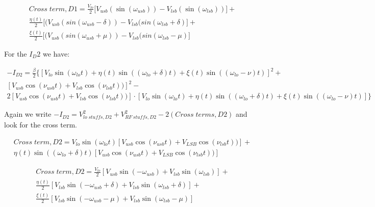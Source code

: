 \begin{equation}
    \boxed{
    \begin{gathered}
    Cross\;term,D1 = \frac{V_{lo}}{2} \big[
        V_{usb}(\sin(\omega_{usb})) - V_{lsb}(
        \sin(\omega_{lsb})) \big] +\\
        \frac{\eta(t)}{2} \big[ (V_{usb} (sin(\omega_{usb}-\delta)
        )-V_{lsb}(sin(\omega_{lsb}+\delta)
        \big]+ \\
        \frac{\xi(t)}{2} \big[ (V_{usb} (sin(\omega_{usb}+\mu)
        )-V_{lsb}(sin(\omega_{lsb}-\mu)
        \big]
    \end{gathered}
    }
\end{equation}
\vspace{0.5cm}



For the $I_D2$ we have:

\begin{equation}
\label{eq:i_d2_complete}
    \begin{gathered}
        -I_{D2} = \frac{\beta}{2}\big\{ \left[V_{lo}\sin(\omega_{lo}t)+\eta(t)\sin((\omega_{lo}+\delta)t)+
        \xi(t)\sin((\omega_{lo}-\nu)t)
        \right]^2 + \\
        \left[V_{usb}\cos(\nu_{usb}t)+V_{lsb}\cos(\nu_{lsb}t))\right]^2 - \\
        2\left[V_{usb}\cos(\nu_{usb}t)+V_{lsb}\cos(\nu_{lsb}t))\right] \cdot \left[ 
        V_{lo}\sin(\omega_{lo}t)+\eta(t)\sin((\omega_{lo}+\delta)t)+\xi(t)\sin((\omega_{lo}-\nu)t)
        \right]
        \big\}
    \end{gathered}
\end{equation}

\vspace{1cm}
Again we write $ -I_{D2}= V_{lo\; stuffs,D2}^2 + V_{RF\: stuffs, D2}^2 - 2(Cross\; terms,D2) $ and look for the cross term.

\begin{equation}
    \begin{gathered}
         Cross\;term,D2 = V_{lo}\sin(\omega_{lo}t)\left[
         V_{usb}\cos(\nu_{usb}t)+V_{LSB}\cos(\nu_{lsb}t))
         \right]+\\
        \eta(t)\sin((\omega_{lo}+\delta)t) \left[
        V_{usb}\cos(\nu_{usb}t)+V_{LSB}\cos(\nu_{lsb}t))
        \right]
    \end{gathered}
\end{equation}

\vspace{1cm}
\begin{equation}
    \begin{gathered}
       Cross\;term,D2 = \frac{V_{lo}}{2}\left[
        V_{usb}\sin(-\omega_{usb}) + V_{lsb}\sin(\omega_{lsb})
        \right] + \\
        \frac{\eta(t)}{2} \left[
        V_{lsb}\sin(-\omega_{usb}+\delta) + V_{lsb}\sin(\omega_{lsb}+\delta)
        \right]+\\
        \frac{\xi(t)}{2} \left[
        V_{lsb}\sin(-\omega_{usb}-\mu) + V_{lsb}\sin(\omega_{lsb}-\mu)
        \right]
    \end{gathered}
\end{equation}

